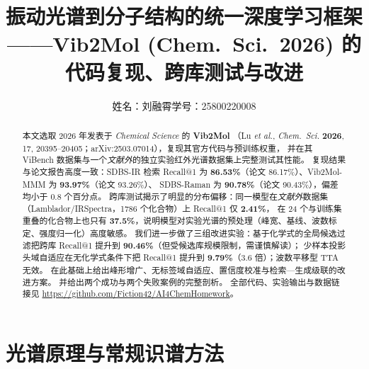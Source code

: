 \documentclass[UTF8,a4paper,11pt]{ctexart}
\title{\bfseries 振动光谱到分子结构的统一深度学习框架\\[2pt]
\large ——Vib2Mol (Chem.\ Sci.\ 2026) 的代码复现、跨库测试与改进}
\author{\small 姓名：刘融霄\qquad 学号：25800220008}
\date{}
\begin{document}
\maketitle
\vspace{-1.2em}

\begin{abstract}
\noindent
本文选取 2026 年发表于 \emph{Chemical Science} 的 \textbf{Vib2Mol}
（Lu \emph{et al.}, \emph{Chem.\ Sci.} \textbf{2026}, 17, 20395--20405；arXiv:2503.07014），复现其官方代码与预训练权重，
并在其 ViBench 数据集与一个\emph{文献外}的独立实验红外光谱数据集上完整测试其性能。
复现结果与论文报告高度一致：SDBS-IR 检索 Recall@1 为 \textbf{86.53\%}（论文 86.17\%）、Vib2Mol-MMM 为 \textbf{93.97\%}（论文 93.26\%）、
SDBS-Raman 为 \textbf{90.78\%}（论文 90.43\%），偏差均小于 0.8 个百分点。
跨库测试揭示了明显的分布偏移：同一模型在\emph{文献外}数据集（Lamblador/IRSpectra，1786 个化合物）上 Recall@1 仅 \textbf{2.41\%}，
在 24 个与训练集重叠的化合物上也只有 \textbf{37.5\%}，说明模型对实验光谱的预处理（峰宽、基线、波数标定、强度归一化）高度敏感。
我们进一步做了三组改进实验：基于化学式的全局候选过滤把跨库 Recall@1 提升到 \textbf{90.46\%}（但受候选库规模限制，需谨慎解读）；
少样本投影头域自适应在无化学式条件下把 Recall@1 提升到 \textbf{9.79\%}（3.6 倍）；波数平移型 TTA 无效。
在此基础上给出峰形增广、无标签域自适应、置信度校准与检索—生成级联的改进方案。
并给出两个成功与两个失败案例的完整剖析。
全部代码、实验输出与数据链接见 \url{https://github.com/Fiction42/AI4ChemHomework}。
\end{abstract}

\newpage
\tableofcontents
\newpage

\section{光谱原理与常规识谱方法}
\end{document}
